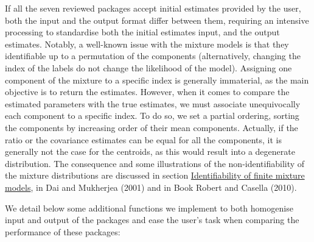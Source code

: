If all the seven reviewed packages accept initial estimates provided by the user, both the input and the output format differ between them, requiring an intensive processing to standardise both the initial estimates input, and the output estimates. Notably, a well-known issue with the mixture models is that they identifiable up to a permutation of the components (alternatively, changing the index of the labels do not change the likelihood of the model). Assigning one component of the mixture to a specific index is generally immaterial, as the main objective is to return the estimates. However, when it comes to compare the estimated parameters with the true estimates, we must associate unequivocally each component to a specific index. To do so, we set a partial ordering, sorting the components by increasing order of their mean components. Actually, if the ratio or the covariance estimates can be equal for all the components, it is generally not the case for the centroids, as this would result into a degenerate distribution. The consequence and some illustrations of the non-identifiability of the mixture distributions are discussed in section \href{https://stats.stackexchange.com/questions/265898/why-is-a-normal-mixture-model-not-identifiable-and-why-does-it-matter}{Identifiability of finite mixture models}, in Dai and Mukherjea (2001) and in Book Robert and Casella (2010).

We detail below some additional functions we implement to both homogenise input and output of the packages and ease the user's task when comparing the performance of these packages:

